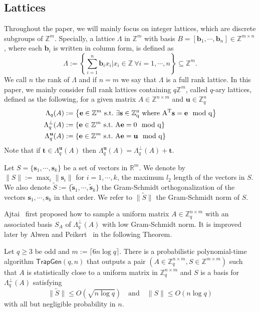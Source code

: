 \documentclass[runningheads]{llncs}
\def\ZZ{\mathbb{Z}}
\def\bf{\mathbf}
\def\TrapGen{\mathsf{TrapGen}}
\def\e{\bf{e}}
\def\L{\Lambda}
\def\Lp{\Lambda^{\perp}}
\def\b{\bf{b}}
\def\s{\bf{s}}
\begin{document}
	
	
	
	
	
	
	
	
	
	
	
	
	
	
	
	
	\subsection{Lattices}
	Throughout the paper, we will mainly focus on integer lattices, which are discrete subgroups of $\ZZ^m$. Specially, a lattice $\Lambda$ in $\ZZ^m$ with basis $B=[\b_1,\cdots,\b_n]\in\ZZ^{m\times n}$, where each $\b_i$ is written in column form, is defined as
	$$\Lambda:=\left\{\sum_{i=1}^n\b_ix_i | x_i\in\ZZ~\forall i=1,\cdots,n \right\}\subseteq\ZZ^m.$$
	We call $n$ the rank of $\L$ and if $n=m$ we say that $\L$ is a full rank lattice. In this paper, we mainly consider full rank lattices containing $q\ZZ^m$, called $q$-ary lattices, defined as the following, for a given matrix $A\in\ZZ^{n\times m}$ and $\bf{u}\in\ZZ_q^n$
	\begin{align*}
	\L_q(A) &:= \left\{ \e\in\ZZ^m ~\rm{s.t.}~ \exists \bf{s}\in\ZZ_q^n~\rm{where}~A^T\bf{s}=\bf{e}\mod q \right\}\\
	\Lp_q(A) &:= \left\{ \e\in\ZZ^m~\rm{s.t.}~A\e=0\mod q \right\} \\
	\L_q^{\bf{u}}(A) &:=  \left\{ \e\in\ZZ^m~\rm{s.t.}~A\e=\bf{u}\mod q \right\}
	\end{align*}
	Note that if $\bf{t}\in\L_q^{\bf{u}}(A)$ then $\L_q^{\bf{u}}(A)=\Lp_q(A)+\bf{t}$.
	
	Let $S=\{\s_1,\cdots,\s_k\}$ be a set of vectors in $\mathbb{R}^m$. We denote by $\|S\|:=\max_i\|\s_i\|$ for $i=1,\cdots,k$, the maximum $l_2$ length of the vectors in $S$. We also denote $\tilde{S}:=\{\tilde{\s}_1,\cdots,\tilde{\s}_k \}$ the Gram-Schmidt orthogonalization of the vectors $\s_1,\cdots,\s_k$ in that order. We refer to $\|\tilde{S}\|$ the Gram-Schmidt norm of $S$.
	
	Ajtai~\cite{Ajtai99} first proposed how to sample a uniform matrix $A\in\ZZ_q^{n\times m}$ with an associated basis $S_A$ of $\Lp_q(A)$ with low Gram-Schmidt norm. It is improved later by Alwen and Peikert~\cite{AP09} in the following Theorem.
	
	\begin{theorem}\label{thm:TrapGen}
		Let $q\geq 3$ be odd and $m:=\lceil 6n\log q\rceil$. There is a probabilistic polynomial-time algorithm $\TrapGen(q,n)$ that outputs a pair $(A\in\ZZ_q^{n\times m},S\in\ZZ^{m\times m})$ such that $A$ is statistically close to a uniform matrix in $\ZZ_q^{n\times m}$ and $S$ is a basis for $\Lp_q(A)$ satisfying
		\[\|\tilde{S}\|\leq O(\sqrt{n\log q})\quad\text{and}\quad\|S\|\leq O(n\log q)\]
		with all but negligible probability in $n$.
	\end{theorem}
	
\end{document}
